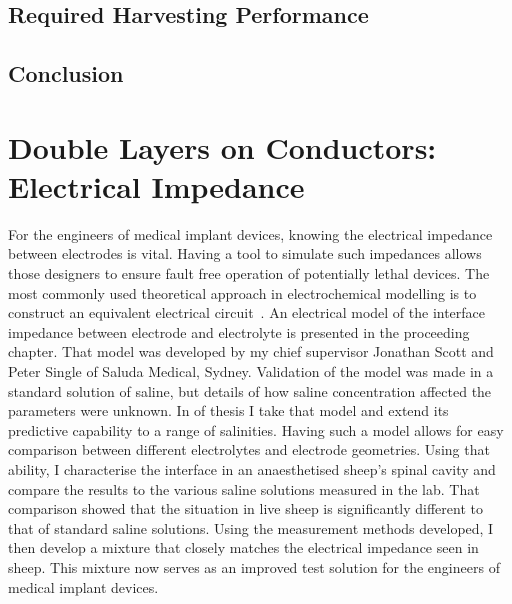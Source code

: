 
   \chapter{Required Harvesting Performance}
     \label{chap:part1_energyHarvestingRequirements}
     


   \chapter{Conclusion}
     \label{chap:part1_conclusion}
     




\part{Double Layers on Conductors: Electrical Impedance}
  \label{part:doubleLayersOnConductors}

  For the engineers of medical implant devices, knowing the electrical impedance between electrodes is vital.
  Having a tool to simulate such impedances allows those designers to ensure fault free operation of potentially lethal devices.
  The most commonly used theoretical approach in electrochemical modelling is to construct an equivalent electrical circuit~\cite{Ishai2013}.
  An electrical model of the interface impedance between electrode and electrolyte is presented in the proceeding chapter.
  That model was developed by my chief supervisor Jonathan Scott and Peter Single of Saluda Medical, Sydney.
  Validation of the model was made in a standard solution of saline, but details of how saline concentration affected the parameters were unknown.
  In \cref{part:doubleLayersOnConductors} of thesis I take that model and extend its predictive capability to a range of salinities.
  Having such a model allows for easy comparison between different electrolytes and electrode geometries.
  Using that ability, I characterise the interface in an anaesthetised sheep's spinal cavity and compare the results to the various saline solutions measured in the lab.
  That comparison showed that the situation in live sheep is significantly different to that of standard saline solutions.
  Using the measurement methods developed, I then develop a mixture that closely matches the electrical impedance seen in sheep.
  This mixture now serves as an improved test solution for the engineers of medical implant devices.

